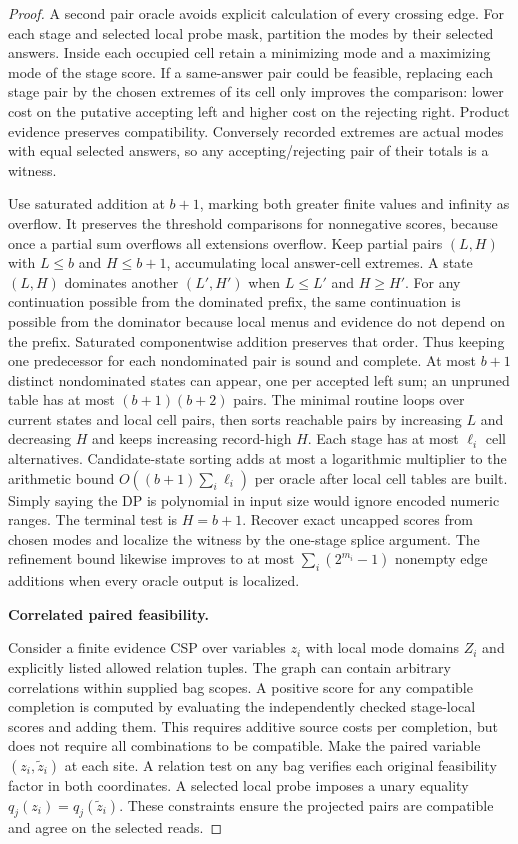 \begin{proof}
A second pair oracle avoids explicit calculation of every crossing edge. For each stage and selected local probe mask, partition the modes by their selected answers. Inside each occupied cell retain a minimizing mode and a maximizing mode of the stage score. If a same-answer pair could be feasible, replacing each stage pair by the chosen extremes of its cell only improves the comparison: lower cost on the putative accepting left and higher cost on the rejecting right. Product evidence preserves compatibility. Conversely recorded extremes are actual modes with equal selected answers, so any accepting/rejecting pair of their totals is a witness.

Use saturated addition at \(b+1\), marking both greater finite values and infinity as overflow. It preserves the threshold comparisons for nonnegative scores, because once a partial sum overflows all extensions overflow. Keep partial pairs \((L,H)\) with \(L\le b\) and \(H\le b+1\), accumulating local answer-cell extremes. A state \((L,H)\) dominates another \((L',H')\) when \(L\le L'\) and \(H\ge H'\). For any continuation possible from the dominated prefix, the same continuation is possible from the dominator because local menus and evidence do not depend on the prefix. Saturated componentwise addition preserves that order. Thus keeping one predecessor for each nondominated pair is sound and complete. At most \(b+1\) distinct nondominated states can appear, one per accepted left sum; an unpruned table has at most \((b+1)(b+2)\) pairs. The minimal routine loops over current states and local cell pairs, then sorts reachable pairs by increasing \(L\) and decreasing \(H\) and keeps increasing record-high \(H\). Each stage has at most \(\ell_i\) cell alternatives. Candidate-state sorting adds at most a logarithmic multiplier to the arithmetic bound \(O((b+1)\sum_i\ell_i)\) per oracle after local cell tables are built. Simply saying the DP is polynomial in input size would ignore encoded numeric ranges. The terminal test is \(H=b+1\). Recover exact uncapped scores from chosen modes and localize the witness by the one-stage splice argument. The refinement bound likewise improves to at most \(\sum_i(2^{m_i}-1)\) nonempty edge additions when every oracle output is localized.

\textbf{Correlated paired feasibility.}

Consider a finite evidence CSP over variables \(z_i\) with local mode domains \(Z_i\) and explicitly listed allowed relation tuples. The graph can contain arbitrary correlations within supplied bag scopes. A positive score for any compatible completion is computed by evaluating the independently checked stage-local scores and adding them. This requires additive source costs per completion, but does not require all combinations to be compatible. Make the paired variable \((z_i,\widetilde z_i)\) at each site. A relation test on any bag verifies each original feasibility factor in both coordinates. A selected local probe imposes a unary equality \(q_j(z_i)=q_j(\widetilde z_i)\). These constraints ensure the projected pairs are compatible and agree on the selected reads.


\end{proof}

